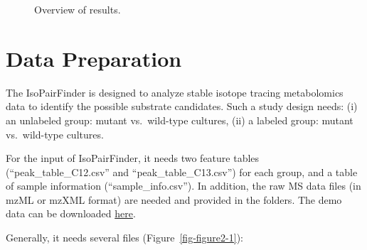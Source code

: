 \documentclass[
  letterpaper,
  DIV=11,
  numbers=noendperiod]{scrreprt}
\begin{document}
\begin{figure}


\caption{\label{fig-figure1-2}Overview of results.}

\end{figure}%


\chapter{Data Preparation}\label{sec-data-preparation}

The IsoPairFinder is designed to analyze stable isotope tracing
metabolomics data to identify the possible substrate candidates. Such a
study design needs: (i) an unlabeled group: mutant vs.~wild-type
cultures, (ii) a labeled group: mutant vs.~wild-type cultures.

For the input of IsoPairFinder, it needs two feature tables
(``peak\_table\_C12.csv'' and ``peak\_table\_C13.csv'') for each group,
and a table of sample information (``sample\_info.csv''). In addition,
the raw MS data files (in mzML or mzXML format) are needed and provided
in the folders. The demo data can be downloaded
\href{https://github.com/DoddLab/IsoPairFinder_demo_data}{here}.

Generally, it needs several files (Figure~\ref{fig-figure2-1}):
\end{document}
